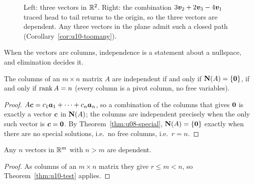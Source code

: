 \begin{figure}[ht]\centering
{}
\caption{Left: three vectors in $\mathbb{R}^2$. Right: the combination $3\boldsymbol{v}_2+2\boldsymbol{v}_3-4\boldsymbol{v}_1$
traced head to tail returns to the origin, so the three vectors are dependent. Any three vectors in
the plane admit such a closed path (Corollary~\ref{cor:u10-toomany}).}
\label{fig:u10-loop}
\end{figure}

When the vectors are columns, independence is a statement about a nullspace, and elimination
decides it.

\begin{theorem}\label{thm:u10-test}
The columns of an $m\times n$ matrix $A$ are independent if and only if $\mathbf{N}(A)=\{\boldsymbol{0}\}$, if
and only if $\operatorname{rank} A=n$ (every column is a pivot column, no free variables).
\end{theorem}
\begin{proof}
$A\boldsymbol{c}=c_1\boldsymbol{a}_1+\dots+c_n\boldsymbol{a}_n$, so a combination of the columns that gives $\boldsymbol{0}$ is
exactly a vector $\boldsymbol{c}$ in $\mathbf{N}(A)$; the columns are independent precisely when the only such
vector is $\boldsymbol{c}=\boldsymbol{0}$. By Theorem~\ref{thm:u08-special}, $\mathbf{N}(A)=\{\boldsymbol{0}\}$ exactly when there
are no special solutions, i.e.\ no free columns, i.e.\ $r=n$.
\end{proof}

\begin{corollary}\label{cor:u10-toomany}
Any $n$ vectors in $\mathbb{R}^m$ with $n>m$ are dependent.
\end{corollary}
\begin{proof}
As columns of an $m\times n$ matrix they give $r\le m<n$, so Theorem~\ref{thm:u10-test} applies.
\end{proof}

